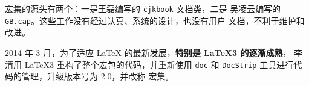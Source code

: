 \documentclass{ctexart}
\begin{document}
\CTeX{} 宏集的源头有两个：一是{王磊}编写的 \texttt{cjkbook} 文档类，二是%
{吴凌云}编写的 \texttt{GB.cap}。这些工作没有经过认真、系统的设计，也没有用户
文档，不利于维护和改进。

\textsf{2014 年 3 月，为了适应 \LaTeX{} 的最新发展，\textbf{特别是 \LaTeX3 的逐渐成熟}，
  {李清}用 \LaTeX3 重构了整个宏包的代码，并重新使用 \texttt{doc} 和
  \texttt{DocStrip} 工具进行代码的管理，升级版本号为 2.0，并改称 \CTeX{} 宏集。}
\end{document}
